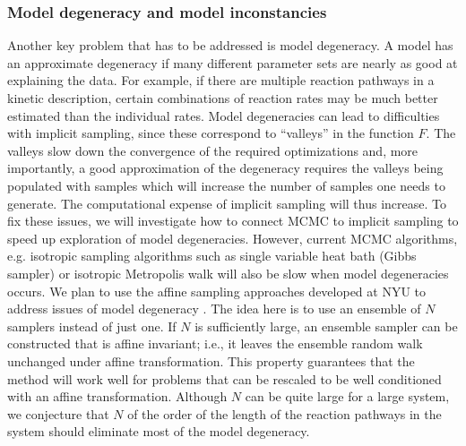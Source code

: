\documentclass[11pt]{article}
\newcommand{\MarginPar}[1]{\marginpar{%
\vskip-\baselineskip %
\raggedright\tiny\sffamily
\hrule\smallskip{\color{red}#1}\par\smallskip\hrule}}
\begin{document}
\subsubsection*{Model degeneracy and model inconstancies}
Another key problem that has to be addressed is model degeneracy.
A model has an approximate degeneracy if many different parameter sets are nearly as good at explaining the data.
For example, if there are multiple reaction pathways in a kinetic description,
certain combinations of reaction rates may be much better
estimated than the individual rates. Model degeneracies can lead to difficulties with implicit sampling, since these correspond to ``valleys'' in  the function $F$.
The valleys slow down the convergence of the required optimizations and, more importantly, a good approximation of the degeneracy requires the valleys being populated with samples which will increase the number of samples one needs to generate.
The computational expense of implicit sampling will thus increase.
To fix these issues, we will investigate how to connect MCMC to implicit sampling to speed up exploration of model degeneracies.
However, current MCMC algorithms, e.g. isotropic sampling algorithms such as single variable heat bath (Gibbs sampler) or isotropic Metropolis walk will also be slow when model degeneracies occurs.
We plan to use the affine sampling approaches developed at NYU to address issues of model degeneracy \cite{GoodmanWeare2010}.
The idea here is to use an ensemble of $N$ samplers instead of just one. 
If $N$ is sufficiently large, an ensemble sampler can be constructed that is affine invariant; i.e., it leaves the ensemble
random walk unchanged under affine transformation.  This property guarantees that the method will work well for problems that can
be rescaled to be well conditioned with an affine transformation.
Although $N$ can be quite large for a large system, we conjecture that $N$ of the order of the length of the reaction pathways
in the system should eliminate most of the model degeneracy.
\MarginPar{(matti): Jonathan, does this make sense?}
\end{document}
